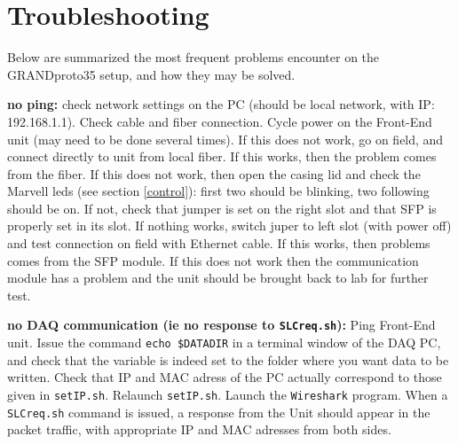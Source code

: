 \section{Troubleshooting}
Below are summarized the most frequent problems encounter on the GRANDproto35 setup, and how they may be solved.

\begin{enumerate}[$\bullet$]
{\item {\bf no ping:} check network settings on the PC (should be local network, with IP: 192.168.1.1). Check cable and fiber connection. Cycle power on the Front-End unit (may need to be done several times). If this does not work, go on field, and connect directly to unit from local fiber. If this works, then the problem comes from the fiber. If this does not work, then open the casing lid and check the Marvell leds (see section \ref{control}): first two should be blinking, two following should be on. If not, check that jumper is set on the right slot and that SFP is properly set in its slot. If nothing works, switch juper to left slot (with power off) and test connection on field with Ethernet cable. If this works, then problems comes from the SFP module. If this does not work then the communication module has a problem and the unit should be brought back to lab for further test.}
{\item {\bf no DAQ communication (ie no response to \texttt{SLCreq.sh}):} Ping Front-End unit. Issue the command \texttt{echo \$DATADIR} in a terminal window of the DAQ PC, and check that the variable is indeed set to the folder where you want data to be written. Check that IP and MAC adress of the PC actually correspond to those given in \texttt{setIP.sh}. Relaunch \texttt{setIP.sh}. Launch the \texttt{Wireshark} program. When a \texttt{SLCreq.sh} command is issued, a response from the Unit should appear in the packet traffic, with appropriate IP and MAC adresses from both sides.}
\end{enumerate}
